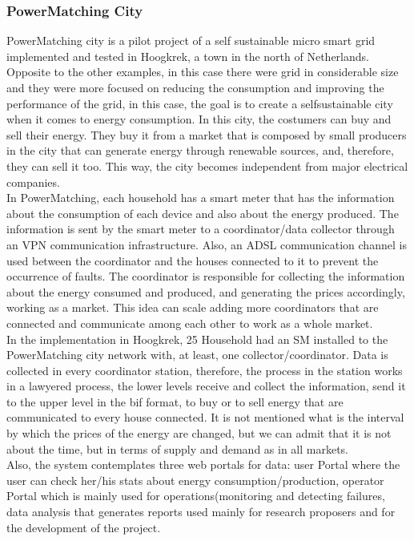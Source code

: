 \subsubsection{PowerMatching City}
PowerMatching city\cite{website:powermatching} is a pilot project of a self sustainable micro smart grid
implemented and tested in Hoogkrek, a town in the north of Netherlands. Opposite to the other examples, in this case there were grid in considerable size and they were more focused on reducing the consumption and improving the performance of the grid, in this case, the goal is to create a self­sustainable city when it comes to energy consumption. In this city, the costumers can buy and sell their energy. They buy it from a market that is composed by small producers in the city that can generate energy through renewable sources, and, therefore, they can sell it too. This way, the city becomes independent from major electrical companies. \\
In PowerMatching, each household has a smart meter that has the information about the consumption of each device and also about the energy produced. The information is sent by the smart meter to a coordinator/data collector through an VPN communication infrastructure. Also, an ADSL communication channel is used between the coordinator and the houses connected to it to prevent the occurrence of faults. The coordinator is responsible for collecting the information about the energy consumed and produced, and generating the prices accordingly, working as a market. This idea can scale adding more coordinators that are connected and communicate among each other to work as a whole market.\\
In the implementation in Hoogkrek, 25 Household had an SM installed to the PowerMatching city network with, at least, one collector/coordinator. Data is collected in every coordinator station, therefore, the process in the
station works in a lawyered process, the lower levels receive and collect the information, send it to the upper level in  the bif format, to buy or to sell energy that are communicated to every house connected. It is not
mentioned what is the interval by which the prices of the energy are changed, but we can admit that it is not about the time, but in terms of supply and demand as in all markets.\\
Also, the system contemplates three web portals for data: user Portal where the user can check her/his stats about energy consumption/production, operator Portal which is mainly used for operations(monitoring and detecting failures, data analysis that generates reports used mainly for research proposers and for the development of the project.\\
